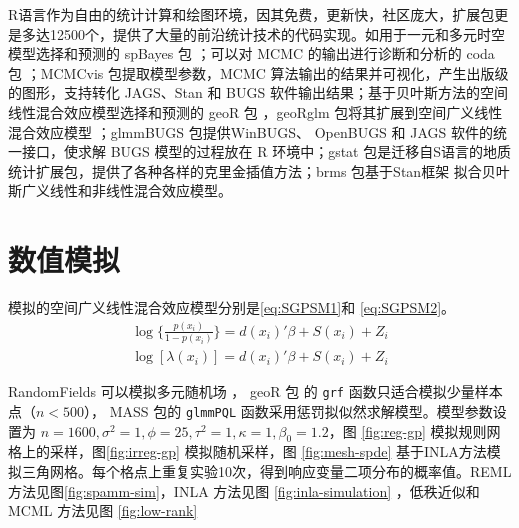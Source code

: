 \documentclass[hyperref, a4paper, UTF8, zihao = -4, linespread = 1.25, scheme = chinese]{ctexbook}
\begin{document}
R语言作为自由的统计计算和绘图环境，因其免费，更新快，社区庞大，扩展包更是多达12500个，提供了大量的前沿统计技术的代码实现。如用于一元和多元时空模型选择和预测的
spBayes 包 \citep{spBayes2015}；可以对 MCMC 的输出进行诊断和分析的 coda
包 \citep{coda2006}；MCMCvis 包提取模型参数，MCMC
算法输出的结果并可视化，产生出版级的图形，支持转化 JAGS、Stan 和 BUGS
软件输出结果\citep{R-MCMCvis}；基于贝叶斯方法的空间线性混合效应模型选择和预测的
geoR 包 \citep{geoR2001}，geoRglm 包将其扩展到空间广义线性混合效应模型
\citep{geoRglm2002}；glmmBUGS 包提供WinBUGS、 OpenBUGS 和 JAGS
软件的统一接口，使求解 BUGS 模型的过程放在 R
环境中\citep{R-glmmBUGS, glmmBUGS2010MCMC}；gstat
包是迁移自S语言的地质统计扩展包，提供了各种各样的克里金插值方法\citep{gstat2004, gstat2016}；brms
包基于Stan框架
拟合贝叶斯广义线性和非线性混合效应模型\citep{brms2017JSS}。

\hypertarget{simulations}{%
\chapter{数值模拟}\label{simulations}}

模拟的空间广义线性混合效应模型分别是\eqref{eq:SGPSM1}和
\eqref{eq:SGPSM2}。\begin{gather}
\log\big\{\frac{p(x_i)}{1-p(x_i)}\big\} = d(x_i)'\beta + S(x_i) + Z_i \label{eq:SGPSM1}\\
\log[\lambda(x_i)] = d(x_i)'\beta + S(x_i) + Z_i \label{eq:SGPSM2}
\end{gather}

RandomFields 可以模拟多元随机场 \citep{RandomFields2015}， geoR
包\citep{R-geoR} 的 \texttt{grf}
函数只适合模拟少量样本点（\(n < 500\)）， MASS 包的 \texttt{glmmPQL}
函数采用惩罚拟似然求解模型\citep{MASS2002}。模型参数设置为
\(n=1600,\sigma^2=1,\phi=25,\tau^2=1,\kappa=1,\beta_0=1.2\)，图
\ref{fig:reg-gp} 模拟规则网格上的采样，图\ref{fig:irreg-gp}
模拟随机采样，图 \ref{fig:mesh-spde}
基于INLA方法模拟三角网格。每个格点上重复实验10次，得到响应变量二项分布的概率值。REML
方法见图\ref{fig:spamm-sim}，INLA 方法见图 \ref{fig:inla-simulation}
，低秩近似和 MCML 方法见图 \ref{fig:low-rank}
\end{document}
